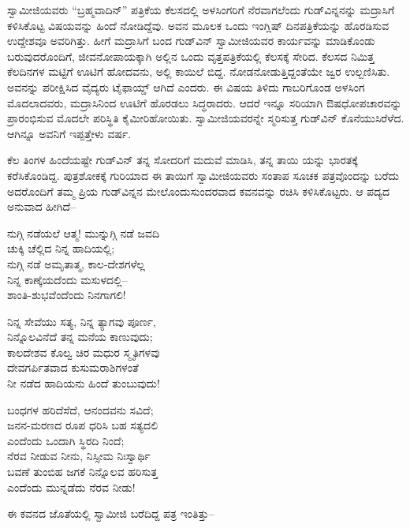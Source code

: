 ಸ್ವಾಮೀಜಿಯವರು “ಬ್ರಹ್ಮವಾದಿನ್​” ಪತ್ರಿಕೆಯ ಕೆಲಸದಲ್ಲಿ ಅಳಸಿಂಗರಿಗೆ ನೆರವಾಗಲೆಂದು ಗುಡ್​ವಿನ್ನನನ್ನು ಮದ್ರಾಸಿಗೆ ಕಳಿಸಿಕೊಟ್ಟ ವಿಷಯವನ್ನು ಹಿಂದೆ ನೋಡಿದ್ದೆವು. ಅವನ ಮೂಲಕ ಒಂದು ಇಂಗ್ಲಿಷ್ ದಿನಪತ್ರಿಕೆಯನ್ನು ಹೊರಡಿಸುವ ಉದ್ದೇಶವೂ ಅವರಿಗಿತ್ತು. ಹೀಗೆ ಮದ್ರಾಸಿಗೆ ಬಂದ ಗುಡ್​ವಿನ್ ಸ್ವಾಮೀಜಿಯವರ ಕಾರ್ಯವನ್ನು ಮಾಡಿಕೊಂಡು ಬರುವುದರೊಂದಿಗೆ, ಜೀವನೋಪಾಯಕ್ಕಾಗಿ ಅಲ್ಲಿನ ಒಂದು ವೃತ್ತಪತ್ರಿಕೆಯಲ್ಲಿ ಕೆಲಸಕ್ಕೆ ಸೇರಿದ. ಕೆಲಸದ ನಿಮಿತ್ತ ಕೆಲದಿನಗಳ ಮಟ್ಟಿಗೆ ಊಟಿಗೆ ಹೋದವನು, ಅಲ್ಲಿ ಕಾಯಿಲೆ ಬಿದ್ದ. ನೋಡನೋಡುತ್ತಿದ್ದಂತೆಯೇ ಜ್ವರ ಉಲ್ಬಣಿಸಿತು. ಅವನನ್ನು ಪರೀಕ್ಷಿಸಿದ ವೈದ್ಯರು ಟೈಫಾಯ್ಡ್ ಆಗಿದೆ ಎಂದರು. ಈ ವಿಷಯ ತಿಳಿದು ಗಾಬರಿಗೊಂಡ ಅಳಸಿಂಗ ಮೊದಲಾದವರು, ಮದ್ರಾಸಿನಿಂದ ಊಟಿಗೆ ಹೊರಡಲು ಸಿದ್ಧರಾದರು. ಆದರೆ ಇನ್ನೂ ಸರಿಯಾಗಿ ಔಷಧೋಪಚಾರವನ್ನು ಪ್ರಾರಂಭಿಸುವ ಮೊದಲೇ ಪರಿಸ್ಥಿತಿ ಕೈಮೀರಿಹೋಯಿತು. ಸ್ವಾಮೀಜಿಯವರನ್ನೇ ಸ್ಮರಿಸುತ್ತ ಗುಡ್​ವಿನ್ ಕೊನೆಯುಸಿರೆಳೆದ. ಆಗಿನ್ನೂ ಅವನಿಗೆ ಇಪ್ಪತ್ತೇಳು ವರ್ಷ.

ಕೆಲ ತಿಂಗಳ ಹಿಂದೆಯಷ್ಟೇ ಗುಡ್​ವಿನ್ ತನ್ನ ಸೋದರಿಗೆ ಮದುವೆ ಮಾಡಿಸಿ, ತನ್ನ ತಾಯಿ ಯನ್ನು ಭಾರತಕ್ಕೆ ಕರೆಸಿಕೊಂಡಿದ್ದ. ಪುತ್ರಶೋಕಕ್ಕೆ ಗುರಿಯಾದ ಈ ತಾಯಿಗೆ ಸ್ವಾಮೀಜಿಯವರು ಸಂತಾಪ ಸೂಚಕ ಪತ್ರವೊಂದನ್ನು ಬರೆದು ಅದರೊಂದಿಗೆ ತಮ್ಮ ಪ್ರಿಯ ಗುಡ್​ವಿನ್ನನ ಮೇಲೊಂದುಸುಂದರವಾದ ಕವನವನ್ನು ರಚಿಸಿ ಕಳಿಸಿಕೊಟ್ಟರು. ಆ ಪದ್ಯದ ಅನುವಾದ ಹೀಗಿದೆ–

\begin{myquote}
ನುಗ್ಗಿ ನಡೆಯಲೆ ಆತ್ಮ! ಮುನ್ನುಗ್ಗಿ ನಡೆ ಜವದಿ\\ಚುಕ್ಕಿ ಚೆಲ್ಲಿದ ನಿನ್ನ ಹಾದಿಯಲ್ಲಿ;\\ನುಗ್ಗಿ ನಡೆ ಅಮೃತಾತ್ಮ, ಕಾಲ-ದೇಶಗಳೆಲ್ಲ\\ನಿನ್ನ ಕಾಣ್ಕೆಯದೆಂದು ಮಸುಳದಲ್ಲಿ–\\ಶಾಂತಿ-ಶುಭವೆಂದೆಂದು ನಿನಗಾಗಲಿ!
\end{myquote}

\begin{myquote}
ನಿನ್ನ ಸೇವೆಯು ಸತ್ಯ, ನಿನ್ನ ತ್ಯಾಗವು ಪೂರ್ಣ,\\ನಿನ್ನೊಲವಿನೆದೆ ತನ್ನ ಮನೆಯ ಕಾಣುವುದು;\\ಕಾಲದೇಶವ ಕೊಲ್ವ ಚಿರ ಮಧುರ ಸ್ಮೃತಿಗಳವು\\ದೇವಗರ್ಪಿತವಾದ ಕುಸುಮರಾಶಿಗಳಂತೆ\\ನೀ ನಡೆದ ಹಾದಿಯನು ಹಿಂದೆ ತುಂಬುವುದು!
\end{myquote}

\begin{myquote}
ಬಂಧಗಳ ಹರಿದೆಸೆದೆ, ಆನಂದವನು ಸವಿದೆ;\\ಜನನ-ಮರಣದ ರೂಪ ಧರಿಸಿ ಬಹ ಸತ್ಯದಲಿ\\ಎಂದೆಂದು ಒಂದಾಗಿ ಸ್ಥಿರದಿ ನಿಂದೆ;\\ನೆರವ ನೀಡುವ ನೀನು, ನಿಸ್ಸೀಮ ನಿಃಸ್ವಾರ್ಥಿ\\ಬವಣೆ ತುಂಬಿಹ ಜಗಕೆ ನಿನ್ನೊಲವ ಹರಿಸುತ್ತ\\ಎಂದೆಂದು ಮುನ್ನಡೆದು ನೆರವ ನೀಡು!
\end{myquote}

ಈ ಕವನದ ಜೊತೆಯಲ್ಲಿ ಸ್ವಾಮೀಜಿ ಬರೆದಿದ್ದ ಪತ್ರ ಇಂತಿತ್ತು–

